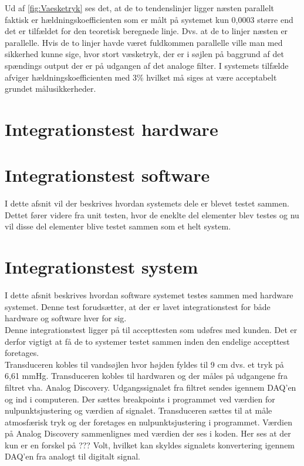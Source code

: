 Ud af \ref{fig:Vaesketryk} ses det, at de to tendenslinjer ligger næsten parallelt faktisk er hældningskoefficienten som er målt på systemet kun 0,0003 større end det er tilfældet for den teoretisk beregnede linje. Dvs. at de to linjer næsten er parallelle. Hvis de to linjer havde været fuldkommen parallelle ville man med sikkerhed kunne sige, hvor stort væsketryk, der er i søjlen på baggrund af det spændings output der er på udgangen af det analoge filter. I systemets tilfælde afviger hældningskoefficienten med 3\% hvilket må siges at være acceptabelt grundet målusikkerheder.


\section{Integrationstest hardware}


\section{Integrationstest software}
I dette afsnit vil der beskrives hvordan systemets dele er blevet testet sammen. Dettet fører videre fra unit testen, hvor de eneklte del elementer blev testes og nu vil disse del elementer blive testet sammen som et helt system. 

\section{Integrationstest system}
I dette afsnit beskrives hvordan software systemet testes sammen med hardware systemet. Denne test forudsætter, at der er lavet integrationstest for både hardware og software hver for sig. \\
Denne integrationstest ligger på til accepttesten som udøfres med kunden. Det er derfor vigtigt at få de to systemer testet sammen inden den endelige accepttest foretages. 
\\
Transduceren kobles til vandsøjlen hvor højden fyldes til 9 cm dvs. et tryk på 6,61 mmHg. Transduceren kobles til hardwaren og der måles på udgangene fra filtret vha. Analog Discovery. Udgangssignalet fra filtret sendes igennem DAQ’en og ind i computeren. Der sættes breakpoints i programmet ved værdien for nulpunktsjustering og værdien af signalet. 
Transduceren sættes til at måle atmosfærisk tryk og der foretages en nulpunktsjustering i programmet. Værdien på Analog Discovery sammenlignes med værdien der ses i koden. Her ses at der kun er en forskel på ??? Volt, hvilket kan skyldes signalets konvertering igennem DAQ’en fra analogt til digitalt signal. 

